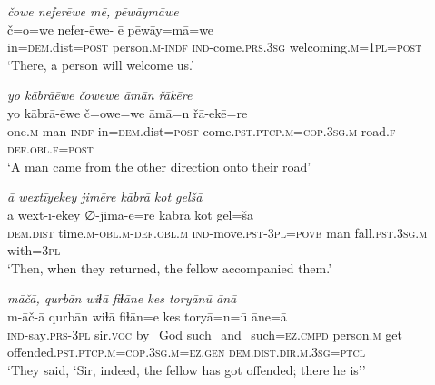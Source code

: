 \ea \label{HB.34}
\textit{čowe neferēwe mē, pēwāymāwe} \\ 
\gll č=o=we nefer-ēwe- ē pēwāy=mā=we \\ 
 in\textsc{=dem}.dist\textsc{=\textsc{post}} person\textsc{.m}\textsc{-indf} \textsc{ind-}come\textsc{.prs}\textsc{.3sg} welcoming\textsc{.m}\textsc{=1pl}\textsc{=\textsc{post}} \\ 
\glt `There, a person will welcome us.'
\z 
 
\ea \label{HB.49}
\textit{yo kābrāēwe čowewe āmān řākēre} \\ 
\gll yo kābrā-ēwe č=owe=we āmā=n řā-ekē=re \\ 
 one\textsc{.m} man\textsc{-indf} in\textsc{=dem}.dist\textsc{=\textsc{post}} come\textsc{.pst}\textsc{.ptcp}\textsc{.m}\textsc{=cop}\textsc{.3sg}\textsc{.m} road\textsc{\textsc{.f}}\textsc{-def}\textsc{.obl}\textsc{\textsc{.f}}\textsc{=\textsc{post}} \\ 
\glt `A man came from the other direction onto their road'
\z 
 
\ea \label{HB.59}
\textit{ā wextīyekey jimēre kābrā kot gelšā} \\ 
\gll ā wext-ī-ekey ∅-jimā-ē=re kābrā kot gel=šā \\ 
 \textsc{dem.dist} time\textsc{.m}\textsc{-obl}\textsc{.m}\textsc{-def}\textsc{.obl}\textsc{.m} \textsc{ind-}move\textsc{.pst}\textsc{-3pl}\textsc{=\textsc{povb}} man fall\textsc{.pst}\textsc{.3sg}\textsc{.m} with\textsc{=3pl} \\ 
\glt `Then, when they returned, the fellow accompanied them.'
\z 
 
\ea \label{HB.76}
\textit{māčā, qurbān wiɫā fiɫāne kes toryānū ānā} \\ 
\gll m-āč-ā qurbān wiɫā fiɫān=e kes toryā=n=ū āne=ā \\ 
 \textsc{ind-}say\textsc{.prs}\textsc{-3pl} sir.\textsc{voc} by\_God such\_and\_such\textsc{=ez}\textsc{.cmpd} person\textsc{.m} get offended\textsc{.pst}\textsc{.ptcp}\textsc{.m}\textsc{=cop}\textsc{.3sg}\textsc{.m}\textsc{=ez}\textsc{.gen} \textsc{dem.dist}\textsc{.dir}\textsc{.m}\textsc{.3sg}=\textsc{ptcl} \\ 
\glt `They said, ‘Sir, indeed, the fellow has got offended; there he is’'
\z 
 
